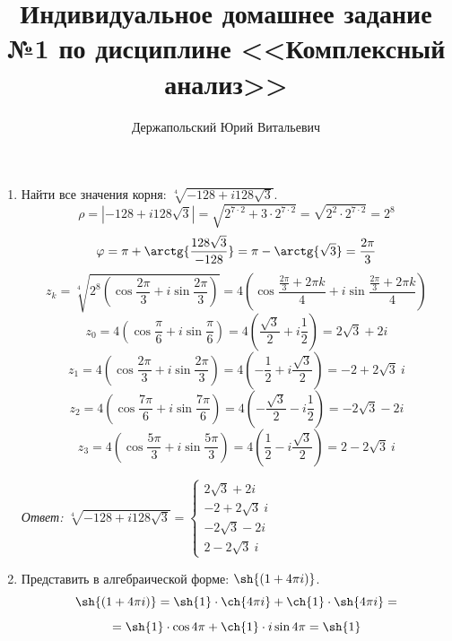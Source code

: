 \documentclass[14pt, a4paper, titlepage, fleqn]{extarticle}
\title{Индивидуальное домашнее задание №1 по дисциплине <<Комплексный анализ>>}
\author{Держапольский Юрий Витальевич}
\date{}
\newcommand{\otv}{\textit{Ответ:} }
\begin{document}
    \maketitle

    \begin{enumerate}
        \item Найти все значения корня: \( \sqrt[4]{-128+ i 128 \sqrt{3}} \).
        \[ 
            \rho = \left\vert -128+ i 128 \sqrt{3} \right\vert 
            = \sqrt{ 2^{7 \cdot 2} + 3 \cdot 2^{7 \cdot 2} } 
            = \sqrt{ 2^2 \cdot 2^{7 \cdot 2} } = 2^8 
        \]
        \[
            \varphi = \pi + \arctg{\frac{128\sqrt{3}}{-128}} = \pi - \arctg{\sqrt{3}} = \frac{2 \pi}{3}
        \]
        \[
            z_k = \sqrt[4]{2^8 \left( \cos{\frac{2 \pi}{3}} + i \sin{\frac{2 \pi}{3}} \right)} =
            4 \left( \cos{\frac{\frac{2 \pi}{3}+2\pi k}{4}} + i \sin{\frac{\frac{2 \pi}{3}+2\pi k}{4}} \right)
        \]
        \[
            z_0 = 4 \left( \cos{\frac{\pi}{6}} + i \sin{\frac{\pi}{6}} \right) = 4 \left( \frac{\sqrt{3}}{2} + i \frac{1}{2} \right) = 2\sqrt{3} + 2i
        \]
        \[
            z_1 = 4 \left( \cos{\frac{2\pi}{3}} + i \sin{\frac{2\pi}{3}} \right) = 4 \left( -\frac{1}{2} + i \frac{\sqrt{3}}{2} \right) = -2 + 2\sqrt{3} ~ i
        \]
        \[
            z_2 = 4 \left( \cos{\frac{7\pi}{6}} + i \sin{\frac{7\pi}{6}} \right) = 4 \left( -\frac{\sqrt{3}}{2} - i \frac{1}{2} \right) = -2\sqrt{3} - 2i
        \]
        \[
            z_3 = 4 \left( \cos{\frac{5\pi}{3}} + i \sin{\frac{5\pi}{3}} \right) = 4 \left( \frac{1}{2} - i \frac{\sqrt{3}}{2} \right) = 2 - 2\sqrt{3} ~ i
        \]

        \otv \(
            \displaystyle
            \sqrt[4]{-128+ i 128 \sqrt{3}} = 
            \left\lbrace
            \begin{aligned}
                2\sqrt{3} + 2i \\
                -2 + 2\sqrt{3} ~ i \\
                -2\sqrt{3} - 2i \\
                2 - 2\sqrt{3} ~ i
            \end{aligned}
            \right.
        \)

        \pagebreak

        \item Представить в алгебраической форме: \( \sh{\left( 1 + 4 \pi i \right)} \).
        \[
            \sh{\left( 1 + 4 \pi i \right)} = \sh{1} \cdot \ch{4 \pi i} + \ch{1} \cdot \sh{4 \pi i} =
        \]
        \[
             = \sh{1} \cdot \cos{4 \pi} + \ch{1} \cdot i \sin{4 \pi} = \sh{1}
        \]


\end{enumerate}
\end{document}
